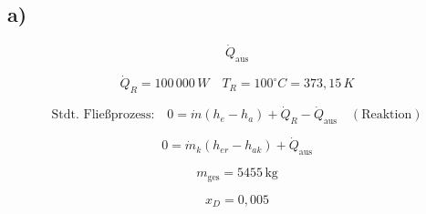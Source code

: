 

\subsection*{a)}

\[
\dot{Q}_{\text{aus}}
\]

\[
\dot{Q}_R = 100 \, 000 \, W \quad T_R = 100^\circ C = 373{,}15 \, K
\]

\[
\text{Stdt. Fließprozess:} \quad 0 = \dot{m} (h_e - h_a) + \dot{Q}_R - \dot{Q}_{\text{aus}} \quad (\text{Reaktion})
\]

\[
0 = \dot{m}_k (h_{er} - h_{ak}) + \dot{Q}_{\text{aus}}
\]

\[
m_{\text{ges}} = 5455 \, \text{kg}
\]

\[
x_D = 0{,}005
\]